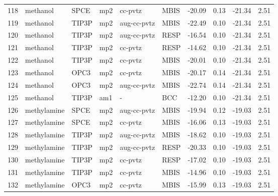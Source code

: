 \begin{tabular}{llllllrrrr}
118 &                       methanol &       SPCE &      mp2 &      cc-pvtz &         MBIS & -20.09 &      0.13 &      -21.34 &     2.51 \\
119 &                       methanol &      TIP3P &      mp2 &  aug-cc-pvtz &         MBIS & -22.49 &      0.10 &      -21.34 &     2.51 \\
120 &                       methanol &      TIP3P &      mp2 &  aug-cc-pvtz &         RESP & -16.54 &      0.10 &      -21.34 &     2.51 \\
121 &                       methanol &      TIP3P &      mp2 &      cc-pvtz &         RESP & -14.62 &      0.10 &      -21.34 &     2.51 \\
122 &                       methanol &      TIP3P &      mp2 &      cc-pvtz &         MBIS & -20.01 &      0.10 &      -21.34 &     2.51 \\
123 &                       methanol &       OPC3 &      mp2 &      cc-pvtz &         MBIS & -20.17 &      0.14 &      -21.34 &     2.51 \\
124 &                       methanol &       OPC3 &      mp2 &  aug-cc-pvtz &         MBIS & -22.74 &      0.14 &      -21.34 &     2.51 \\
125 &                       methanol &      TIP3P &      am1 &            - &          BCC & -12.20 &      0.10 &      -21.34 &     2.51 \\
126 &                    methylamine &       SPCE &      mp2 &  aug-cc-pvtz &         MBIS & -19.94 &      0.12 &      -19.03 &     2.51 \\
127 &                    methylamine &       SPCE &      mp2 &      cc-pvtz &         MBIS & -16.06 &      0.13 &      -19.03 &     2.51 \\
128 &                    methylamine &      TIP3P &      mp2 &  aug-cc-pvtz &         MBIS & -18.62 &      0.10 &      -19.03 &     2.51 \\
129 &                    methylamine &      TIP3P &      mp2 &  aug-cc-pvtz &         RESP & -20.33 &      0.10 &      -19.03 &     2.51 \\
130 &                    methylamine &      TIP3P &      mp2 &      cc-pvtz &         RESP & -17.02 &      0.10 &      -19.03 &     2.51 \\
131 &                    methylamine &      TIP3P &      mp2 &      cc-pvtz &         MBIS & -14.96 &      0.10 &      -19.03 &     2.51 \\
132 &                    methylamine &       OPC3 &      mp2 &      cc-pvtz &         MBIS & -15.99 &      0.13 &      -19.03 &     2.51 \\

\end{tabular}
